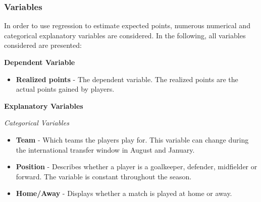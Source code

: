 \subsubsection{Variables}
In order to use regression to estimate expected points, numerous numerical and categorical explanatory variables are considered. In the following, all variables considered are presented: 

\newpar

\textbf{Dependent Variable}
\begin{itemize}
    \item \textbf{Realized points} - The dependent variable. The realized points are the actual points gained by players.
\end{itemize}

\textbf{Explanatory Variables}

\textit{Categorical Variables}
\newpar
\begin{itemize}
    \item \textbf{Team} - Which teams the players play for. This variable can change during the international transfer window in August and January.  
    
    \item \textbf{Position} - Describes whether a player is a goalkeeper, defender, midfielder or forward. The variable is constant throughout the season.
    \item \textbf{Home/Away} - Displays whether a match is played at home or away.
\end{itemize}
\newpar


